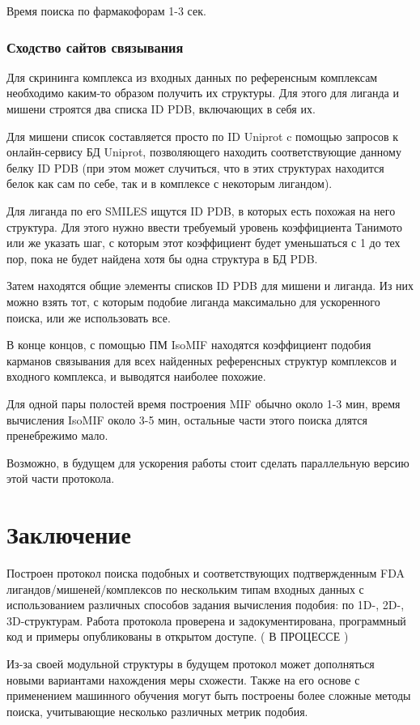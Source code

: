 \documentclass[a4paper,14pt]{article}         %
\begin{document}
Время поиска по фармакофорам 1-3 сек.
\subsubsection{Сходство сайтов связывания}
Для скрининга комплекса из входных данных по референсным комплексам необходимо каким-то образом получить их структуры. Для этого для лиганда и мишени строятся два списка ID PDB, включающих в себя их. 

Для мишени список составляется просто по ID Uniprot c помощью запросов к онлайн-сервису БД Uniprot, позволяющего находить соответствующие данному белку ID PDB (при этом может случиться, что в этих структурах находится белок как сам по себе, так и в комплексе с некоторым лигандом). 

Для лиганда по его SMILES ищутся ID PDB, в которых есть похожая на него структура. Для этого нужно ввести требуемый уровень коэффициента Танимото или же указать шаг, с которым этот коэффициент будет уменьшаться с 1 до тех пор, пока не будет найдена хотя бы одна структура в БД PDB.

Затем находятся общие элементы списков ID PDB для мишени и лиганда. Из них можно взять тот, с которым подобие лиганда максимально для ускоренного поиска, или же использовать все.

В конце концов, с помощью ПМ IsoMIF находятся коэффициент подобия карманов связывания для всех найденных референсных структур комплексов и входного комплекса, и выводятся наиболее похожие.

Для одной пары полостей время построения MIF обычно около 1-3 мин, время вычисления IsoMIF около 3-5 мин, остальные части этого поиска длятся пренебрежимо мало.

Возможно, в будущем для ускорения работы стоит сделать параллельную версию этой части протокола.

\newpage
\section{Заключение}
Построен протокол поиска подобных и соответствующих подтвержденным FDA лигандов/мишеней/комплексов по нескольким типам входных данных с использованием различных способов задания вычисления подобия: по 1D-, 2D-, 3D-структурам. Работа протокола проверена и задокументирована, программный код и примеры опубликованы в открытом доступе. (\color{orange} В ПРОЦЕССЕ \color{black})

Из-за своей модульной структуры в будущем протокол может дополняться новыми вариантами нахождения меры схожести. Также на его основе с применением машинного обучения могут быть построены более сложные методы поиска, учитывающие несколько различных метрик подобия.


\newpage
\printbibliography
\end{document}
